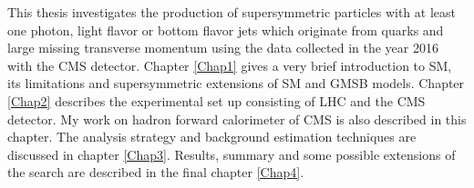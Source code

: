 This thesis investigates the production of supersymmetric particles with at least one photon, light flavor  
or bottom flavor jets which originate from quarks and large 
missing transverse momentum using the data collected in the year 2016 with the CMS detector. Chapter \ref{Chap1} gives a very brief 
introduction to SM, its limitations and supersymmetric extensions of SM and GMSB models. Chapter \ref{Chap2} describes the experimental 
set up consisting of LHC and the CMS detector. My work on hadron forward calorimeter of CMS is also described in this chapter.  The 
analysis strategy and background estimation techniques are discussed in chapter \ref{Chap3}. Results, summary and some possible extensions 
of the search are described in the final chapter \ref{Chap4}.